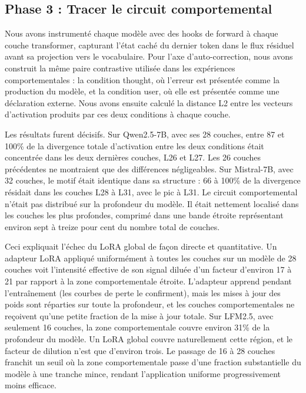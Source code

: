 \documentclass[11pt,a4paper]{article}
\begin{document}
\subsection{Phase 3 : Tracer le circuit comportemental}

Nous avons instrumenté chaque modèle avec des hooks de forward à chaque couche transformer, capturant l'état caché du dernier token dans le flux résiduel avant sa projection vers le vocabulaire. Pour l'axe d'auto-correction, nous avons construit la même paire contrastive utilisée dans les expériences comportementales : la condition thought, où l'erreur est présentée comme la production du modèle, et la condition user, où elle est présentée comme une déclaration externe. Nous avons ensuite calculé la distance L2 entre les vecteurs d'activation produits par ces deux conditions à chaque couche.

Les résultats furent décisifs. Sur Qwen2.5-7B, avec ses 28 couches, entre 87 et 100\% de la divergence totale d'activation entre les deux conditions était concentrée dans les deux dernières couches, L26 et L27. Les 26 couches précédentes ne montraient que des différences négligeables. Sur Mistral-7B, avec 32 couches, le motif était identique dans sa structure : 66 à 100\% de la divergence résidait dans les couches L28 à L31, avec le pic à L31. Le circuit comportemental n'était pas distribué sur la profondeur du modèle. Il était nettement localisé dans les couches les plus profondes, comprimé dans une bande étroite représentant environ sept à treize pour cent du nombre total de couches.

Ceci expliquait l'échec du LoRA global de façon directe et quantitative. Un adapteur LoRA appliqué uniformément à toutes les couches sur un modèle de 28 couches voit l'intensité effective de son signal diluée d'un facteur d'environ 17 à 21 par rapport à la zone comportementale étroite. L'adapteur apprend pendant l'entraînement (les courbes de perte le confirment), mais les mises à jour des poids sont réparties sur toute la profondeur, et les couches comportementales ne reçoivent qu'une petite fraction de la mise à jour totale. Sur LFM2.5, avec seulement 16 couches, la zone comportementale couvre environ 31\% de la profondeur du modèle. Un LoRA global couvre naturellement cette région, et le facteur de dilution n'est que d'environ trois. Le passage de 16 à 28 couches franchit un seuil où la zone comportementale passe d'une fraction substantielle du modèle à une tranche mince, rendant l'application uniforme progressivement moins efficace.
\end{document}

